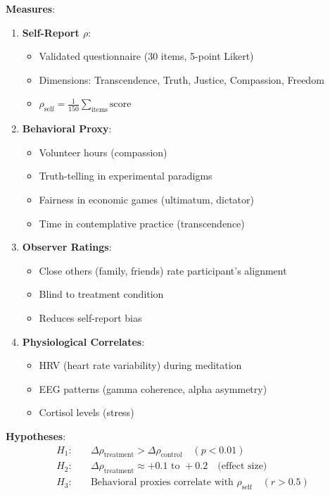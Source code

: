 \documentclass[11pt,a4paper]{article}
\theoremstyle{definition}
\theoremstyle{remark}
\begin{document}
\begin{enumerate}
\begin{protocol}
\textbf{Measures}:
\begin{enumerate}
    \item \textbf{Self-Report \(\rho\)}:
        \begin{itemize}
            \item Validated questionnaire (30 items, 5-point Likert)
            \item Dimensions: Transcendence, Truth, Justice, Compassion, Freedom
            \item \(\rho_{\text{self}} = \frac{1}{150}\sum_{\text{items}} \text{score}\)
        \end{itemize}
    
    \item \textbf{Behavioral Proxy}:
        \begin{itemize}
            \item Volunteer hours (compassion)
            \item Truth-telling in experimental paradigms
            \item Fairness in economic games (ultimatum, dictator)
            \item Time in contemplative practice (transcendence)
        \end{itemize}
    
    \item \textbf{Observer Ratings}:
        \begin{itemize}
            \item Close others (family, friends) rate participant's alignment
            \item Blind to treatment condition
            \item Reduces self-report bias
        \end{itemize}
    
    \item \textbf{Physiological Correlates}:
        \begin{itemize}
            \item HRV (heart rate variability) during meditation
            \item EEG patterns (gamma coherence, alpha asymmetry)
            \item Cortisol levels (stress)
        \end{itemize}
\end{enumerate}

\textbf{Hypotheses}:
\begin{align}
H_1: \quad &\Delta\rho_{\text{treatment}} > \Delta\rho_{\text{control}} \quad (p < 0.01) \\
H_2: \quad &\Delta\rho_{\text{treatment}} \approx +0.1 \text{ to } +0.2 \quad \text{(effect size)} \\
H_3: \quad &\text{Behavioral proxies correlate with } \rho_{\text{self}} \quad (r > 0.5)
\end{align}


\end{protocol}
\end{enumerate}
\end{document}
